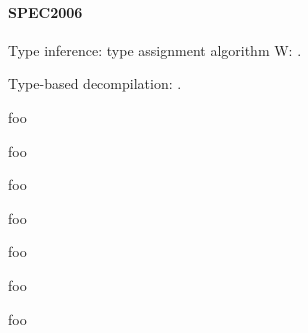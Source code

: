 \documentclass[10pt, a4paper, sigplan, authordraft]{acmart}
\begin{document}

\paragraph{SPEC2006}


Type inference: type assignment algorithm W: \cite{milner_algorithmw}.

Type-based decompilation: \cite{mycroft_type_based_decompilation}.


foo \cite{tie_reverse_engineering_of_types}

foo \cite{second_write_scalable_type_detection}

foo \cite{bintype}

foo \cite{type_inference_on_executables}

foo \cite{dynstruct}

foo \cite{polymorphic_type_inference_for_machine_code}



\clearpage

foo

\clearpage



%
\end{document}
